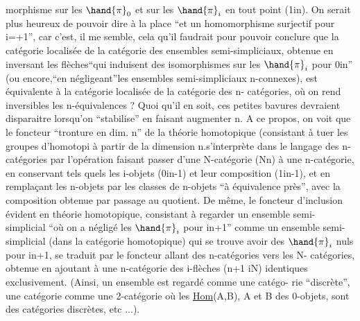 
morphisme sur les $\hand{\pi}_0$ et sur les $\hand{\pi}_i$ en tout point (1\hand{$\leq$}i\hand{$\leq$}n). On serait plus
heureux de pouvoir dire à la place ``et  un homomorphisme surjectif pour
i=+1'', car c'est, il me semble, cela qu'il faudrait pour  pouvoir conclure
que la catégorie localisée de la catégorie des ensembles semi-simpliciaux,
obtenue en inversant les flèches\hand{\textbackslash}``qui induisent des isomorphismes sur les
$\hand{\pi}_i$ pour 0\hand{$\leq$}i\hand{$\leq$}n'' (ou encore,``en négligeant''les ensembles semi-simpliciaux
n-connexes), est équivalente à la catégorie localisée de la catégorie des
n- catégories, où on rend inversibles les n-équivalences ? Quoi qu'il en
soit, ces petites bavures devraient disparaitre lorsqu'on ``stabilise'' en
faisant augmenter n. A ce propos, on voit que le foncteur ``tronture en
dim. n'' de la théorie homotopique (consistant à tuer les groupes d'homotopi
à partir de la dimension n.s'interprète dans le langage des n-catégories
par l'opération faisant passer d'une N-catégorie (N\hand{$>$}n) à une n-catégorie,
en conservant  tels quels les i-objets (0\hand{$\leq$}i\hand{$\leq$}n-1) et leur
composition (1\hand{$\leq$}i\hand{$\leq$}n-1), et en remplaçant les n-objets par les classes 
 de n-objets ``à équivalence près'', avec la composition obtenue
par passage au quotient. De même, le foncteur d'inclusion évident en
théorie homotopique, consistant à regarder un ensemble semi-simplicial
``où on a négligé les $\hand{\pi}_i$ pour i\hand{$\geq$}n+1'' comme un ensemble semi-simplicial 
(dans la catégorie homotopique) qui se trouve avoir des $\hand{\pi}_i$ nuls pour
i\hand{$\geq$}n+1, se traduit par le foncteur allant des n-catégories vers les N-%
catégories, obtenue en ajoutant à une n-catégorie des i-flèches (n+1 \hand{$\leq$}i\hand{$\leq$}N)
identiques exclusivement. (Ainsi, un ensemble est regardé comme une catégo-%
rie ``discrète'', une catégorie comme une 2-catégorie où les \uline{Hom}(A,B), A et B
des 0-objets, sont des catégories discrètes, etc ...).

